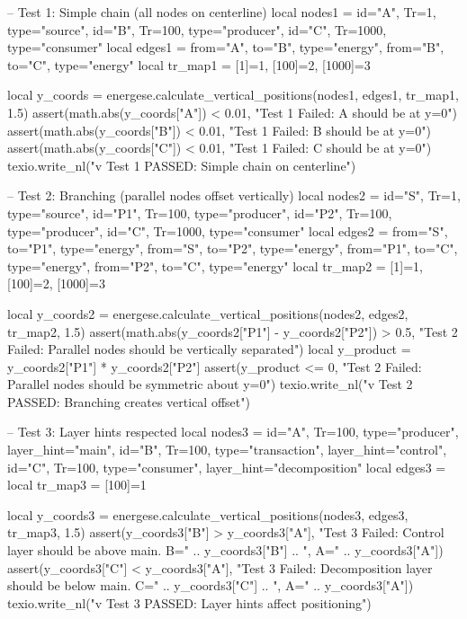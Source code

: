 \documentclass{article}
\begin{document}
\begin{luacode*}
    -- Test 1: Simple chain (all nodes on centerline)
    local nodes1 = {
        {id="A", Tr=1, type="source"},
        {id="B", Tr=100, type="producer"},
        {id="C", Tr=1000, type="consumer"}
    }
    local edges1 = {
        {from="A", to="B", type="energy"},
        {from="B", to="C", type="energy"}
    }
    local tr_map1 = { [1]=1, [100]=2, [1000]=3 }

    local y_coords = energese.calculate_vertical_positions(nodes1, edges1, tr_map1, 1.5)
    assert(math.abs(y_coords["A"]) < 0.01, "Test 1 Failed: A should be at y=0")
    assert(math.abs(y_coords["B"]) < 0.01, "Test 1 Failed: B should be at y=0")
    assert(math.abs(y_coords["C"]) < 0.01, "Test 1 Failed: C should be at y=0")
    texio.write_nl("v Test 1 PASSED: Simple chain on centerline")

    -- Test 2: Branching (parallel nodes offset vertically)
    local nodes2 = {
        {id="S", Tr=1, type="source"},
        {id="P1", Tr=100, type="producer"},
        {id="P2", Tr=100, type="producer"},
        {id="C", Tr=1000, type="consumer"}
    }
    local edges2 = {
        {from="S", to="P1", type="energy"},
        {from="S", to="P2", type="energy"},
        {from="P1", to="C", type="energy"},
        {from="P2", to="C", type="energy"}
    }
    local tr_map2 = { [1]=1, [100]=2, [1000]=3 }

    local y_coords2 = energese.calculate_vertical_positions(nodes2, edges2, tr_map2, 1.5)
    assert(math.abs(y_coords2["P1"] - y_coords2["P2"]) > 0.5,
           "Test 2 Failed: Parallel nodes should be vertically separated")
    local y_product = y_coords2["P1"] * y_coords2["P2"]
    assert(y_product <= 0, "Test 2 Failed: Parallel nodes should be symmetric about y=0")
    texio.write_nl("v Test 2 PASSED: Branching creates vertical offset")

    -- Test 3: Layer hints respected
    local nodes3 = {
        {id="A", Tr=100, type="producer", layer_hint="main"},
        {id="B", Tr=100, type="transaction", layer_hint="control"},
        {id="C", Tr=100, type="consumer", layer_hint="decomposition"}
    }
    local edges3 = {}
    local tr_map3 = { [100]=1 }

    local y_coords3 = energese.calculate_vertical_positions(nodes3, edges3, tr_map3, 1.5)
    assert(y_coords3["B"] > y_coords3["A"],
           "Test 3 Failed: Control layer should be above main. B=" .. y_coords3["B"] .. ", A=" .. y_coords3["A"])
    assert(y_coords3["C"] < y_coords3["A"],
           "Test 3 Failed: Decomposition layer should be below main. C=" .. y_coords3["C"] .. ", A=" .. y_coords3["A"])
    texio.write_nl("v Test 3 PASSED: Layer hints affect positioning")


\end{luacode*}
\end{document}
